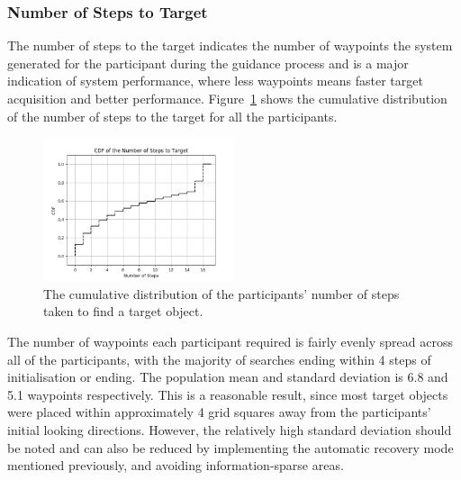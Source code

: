 \documentclass[a4paper, twoside]{article}
\begin{document}
\subsubsection{Number of Steps to Target}

\noindent The number of steps to the target indicates the number of waypoints the system generated for the participant during the guidance process and is a major indication of system performance, where less waypoints means faster target acquisition and better performance. Figure~\ref{fig:nsteps-participants} shows the cumulative distribution of the number of steps to the target for all the participants. 

\begin{figure}
  \centering
  \includegraphics[width=0.5\textwidth]{../figures/cdf_total_steps.png}
  \caption{The cumulative distribution of the participants' number of steps taken to find a target object. }\label{fig:nsteps-participants}
\end{figure}

The number of waypoints each participant required is fairly evenly spread across all of the participants, with the majority of searches ending within 4 steps of initialisation or ending. The population mean and standard deviation is 6.8 and 5.1 waypoints respectively. This is a reasonable result, since most target objects were placed within approximately 4 grid squares away from the participants' initial looking directions. However, the relatively high standard deviation should be noted and can also be reduced by implementing the automatic recovery mode mentioned previously, and avoiding information-sparse areas.

\end{document}
